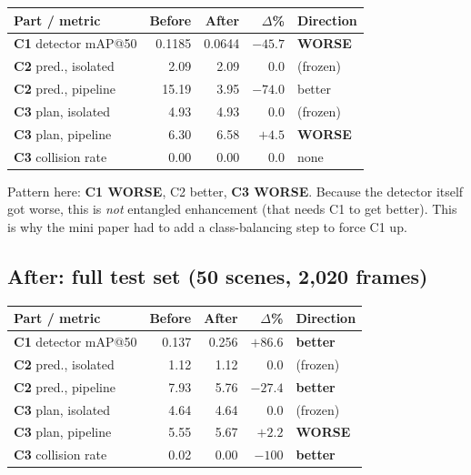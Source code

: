 \documentclass[11pt,a4paper]{article}
\begin{document}
\begin{table}[h!]
\centering
\renewcommand{\arraystretch}{1.3}
\setlength{\tabcolsep}{6pt}
\begin{tabular}{@{}L{4.6cm}rrrl@{}}
\toprule
\textbf{Part / metric} & \textbf{Before} & \textbf{After} & \textbf{$\Delta$\%} & \textbf{Direction} \\
\midrule
\textbf{C1} detector mAP@50   & 0.1185  & 0.0644 & $-45.7$ & \textbf{WORSE} \\
\textbf{C2} pred., isolated   & 2.09    & 2.09   & $0.0$   & (frozen) \\
\textbf{C2} pred., pipeline   & 15.19   & 3.95   & $-74.0$ & better \\
\textbf{C3} plan, isolated    & 4.93    & 4.93   & $0.0$   & (frozen) \\
\textbf{C3} plan, pipeline    & 6.30    & 6.58   & $+4.5$  & \textbf{WORSE} \\
\textbf{C3} collision rate    & 0.00    & 0.00   & $0.0$   & none \\
\bottomrule
\end{tabular}
\end{table}

\noindent
Pattern here: \textbf{C1 WORSE}, C2 better, \textbf{C3 WORSE}. Because the
detector itself got worse, this is \emph{not} entangled enhancement (that needs
C1 to get better). This is why the mini paper had to add a class-balancing step
to force C1 up.

\subsection*{After: full test set (50 scenes, 2,020 frames)}

\begin{table}[h!]
\centering
\renewcommand{\arraystretch}{1.3}
\setlength{\tabcolsep}{6pt}
\begin{tabular}{@{}L{4.6cm}rrrl@{}}
\toprule
\textbf{Part / metric} & \textbf{Before} & \textbf{After} & \textbf{$\Delta$\%} & \textbf{Direction} \\
\midrule
\textbf{C1} detector mAP@50   & 0.137   & 0.256  & $+86.6$ & \textbf{better} \\
\textbf{C2} pred., isolated   & 1.12    & 1.12   & $0.0$   & (frozen) \\
\textbf{C2} pred., pipeline   & 7.93    & 5.76   & $-27.4$ & \textbf{better} \\
\textbf{C3} plan, isolated    & 4.64    & 4.64   & $0.0$   & (frozen) \\
\textbf{C3} plan, pipeline    & 5.55    & 5.67   & $+2.2$  & \textbf{WORSE} \\
\textbf{C3} collision rate    & 0.02    & 0.00   & $-100$  & \textbf{better} \\
\bottomrule
\end{tabular}
\end{table}
\end{document}
